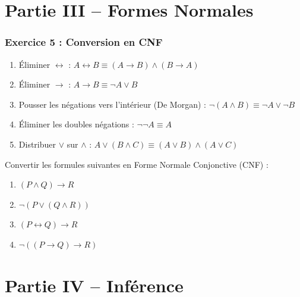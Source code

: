 \documentclass[11pt,a4paper]{article}
\begin{document}
\part*{Partie III -- Formes Normales}

\section*{Exercice 5 : Conversion en CNF}

\begin{methodebox}
\begin{enumerate}
    \item Éliminer $\leftrightarrow$ : $A \leftrightarrow B \equiv (A \rightarrow B) \land (B \rightarrow A)$
    \item Éliminer $\rightarrow$ : $A \rightarrow B \equiv \neg A \lor B$
    \item Pousser les négations vers l'intérieur (De Morgan) : $\neg(A \land B) \equiv \neg A \lor \neg B$
    \item Éliminer les doubles négations : $\neg\neg A \equiv A$
    \item Distribuer $\lor$ sur $\land$ : $A \lor (B \land C) \equiv (A \lor B) \land (A \lor C)$
\end{enumerate}
\end{methodebox}

\begin{exercice}
Convertir les formules suivantes en Forme Normale Conjonctive (CNF) :

\begin{enumerate}
    \item $(P \land Q) \rightarrow R$
    \item $\neg(P \lor (Q \land R))$
    \item $(P \leftrightarrow Q) \rightarrow R$
    \item $\neg((P \rightarrow Q) \rightarrow R)$
\end{enumerate}
\end{exercice}

\part*{Partie IV -- Inférence}
\end{document}

